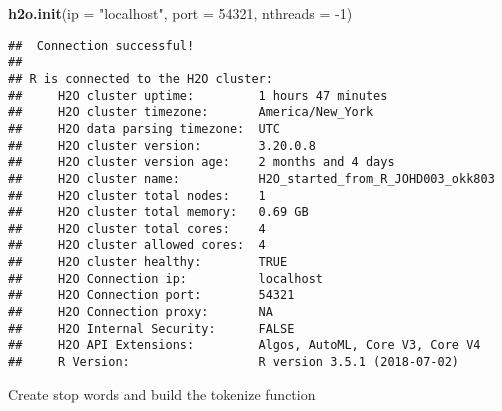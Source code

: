 \documentclass[]{article}
\newenvironment{Shaded}{\begin{snugshade}}{\end{snugshade}}
\newcommand{\KeywordTok}[1]{\textcolor[rgb]{0.13,0.29,0.53}{\textbf{{#1}}}}
\newcommand{\DataTypeTok}[1]{\textcolor[rgb]{0.13,0.29,0.53}{{#1}}}
\newcommand{\DecValTok}[1]{\textcolor[rgb]{0.00,0.00,0.81}{{#1}}}
\newcommand{\StringTok}[1]{\textcolor[rgb]{0.31,0.60,0.02}{{#1}}}
\newcommand{\NormalTok}[1]{{#1}}
\begin{document}
\begin{Shaded}
\begin{Highlighting}[]
\KeywordTok{h2o.init}\NormalTok{(}\DataTypeTok{ip =}  \StringTok{"localhost"}\NormalTok{, }\DataTypeTok{port =} \DecValTok{54321}\NormalTok{, }\DataTypeTok{nthreads =} \NormalTok{-}\DecValTok{1}\NormalTok{)}
\end{Highlighting}
\end{Shaded}

\begin{verbatim}
##  Connection successful!
## 
## R is connected to the H2O cluster: 
##     H2O cluster uptime:         1 hours 47 minutes 
##     H2O cluster timezone:       America/New_York 
##     H2O data parsing timezone:  UTC 
##     H2O cluster version:        3.20.0.8 
##     H2O cluster version age:    2 months and 4 days  
##     H2O cluster name:           H2O_started_from_R_JOHD003_okk803 
##     H2O cluster total nodes:    1 
##     H2O cluster total memory:   0.69 GB 
##     H2O cluster total cores:    4 
##     H2O cluster allowed cores:  4 
##     H2O cluster healthy:        TRUE 
##     H2O Connection ip:          localhost 
##     H2O Connection port:        54321 
##     H2O Connection proxy:       NA 
##     H2O Internal Security:      FALSE 
##     H2O API Extensions:         Algos, AutoML, Core V3, Core V4 
##     R Version:                  R version 3.5.1 (2018-07-02)
\end{verbatim}

Create stop words and build the tokenize function
\end{document}

